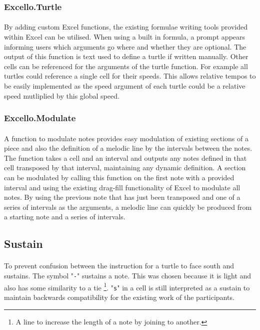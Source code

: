 \subsubsection{Excello.Turtle}

\paragraph{} By adding custom Excel functions, the existing formulae writing tools provided within Excel can be utilised. When using a built in formula, a prompt appears informing users which arguments go where and whether they are optional. The output of this function is text used to define a turtle if written manually. Other cells can be referenced for the arguments of the turtle function. For example all turtles could reference a single cell for their speeds. This allows relative tempos to be easily implemented as the speed argument of each turtle could be a relative speed mutliplied by this global speed.

\subsubsection{Excello.Modulate}

\paragraph{} A function to modulate notes provides easy modulation of existing sections of a piece and also the definition of a melodic line by the intervals between the notes. The function takes a cell and an interval and outputs any notes defined in that cell transposed by that interval, maintaining any dynamic definition. A section can be modulated by calling this function on the first note with a provided interval and using the existing drag-fill functionality of Excel to modulate all notes. By using the previous note that has just been transposed and one of a series of intervals as the arguments, a melodic line can quickly be produced from a starting note and a series of intervals.


\subsection{Sustain}

\paragraph{} To prevent confusion between the instruction for a turtle to face south and sustains. The symbol "\texttt{-}" sustains a note. This was chosen because it is light and also has some similarity to a tie \footnote{A line to increase the length of a note by joining to another.}. "\texttt{s}" in a cell is still interpreted as a sustain to maintain backwards compatibility for the existing work of the participants.

